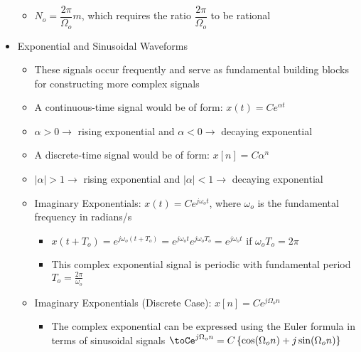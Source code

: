 \begin{itemize}
\begin{itemize}
      \item $N_o=\dfrac{2\pi}{\Omega_o}m$, which requires the ratio $\dfrac{2\pi}{\Omega_o}$ to be rational

    \end{itemize}

  \item Exponential and Sinusoidal Waveforms

    \begin{itemize}

      \item These signals occur frequently and serve as fundamental building blocks for constructing more complex signals

      \item A continuous-time signal would be of form: $x(t)=Ce^{\alpha t}$

      \item $\alpha>0\to$ rising exponential and $\alpha<0\to$ decaying exponential

      \item A discrete-time signal would be of form: $x[n]=C\alpha^n$

      \item $|\alpha|>1\to$ rising exponential and $|\alpha|<1\to$ decaying exponential

      \item Imaginary Exponentials: $x(t)=Ce^{j\omega_ot}$, where $\omega_o$ is the fundamental frequency in radians/s

        \begin{itemize}

          \item $x(t+T_o)=e^{j\omega_o(t+T_o)}=e^{j\omega_ot}e^{j\omega_oT_o}=e^{j\omega_ot}$ if $\omega_oT_o=2\pi$

          \item This complex exponential signal is periodic with fundamental period $T_o=\frac{2\pi}{\omega_o}$

        \end{itemize}

      \item Imaginary Exponentials (Discrete Case): $x[n]=Ce^{j\Omega_on}$

        \begin{itemize}

          \item The complex exponential can be expressed using the Euler formula in terms of sinusoidal signals $\toCe^{j\Omega_on}=C\left\{ \cos(\Omega_on)+j\sin(\Omega_on) \right\}$ 


\end{itemize}
\end{itemize}
\end{itemize}
